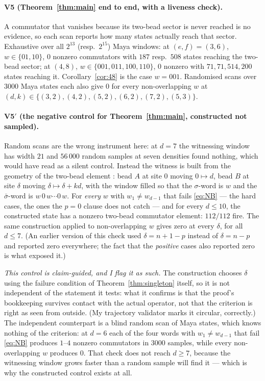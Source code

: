 \documentclass[11pt]{article}
\theoremstyle{definition}
\theoremstyle{remark}
\begin{document}
\paragraph{V5 (Theorem~\ref{thm:main} end to end, with a liveness check).}  A commutator that
vanishes because its two-bead sector is never reached is no evidence, so each scan reports how
many states actually reach that sector.  Exhaustive over all $2^{13}$ (resp.\ $2^{15}$) Maya
windows: at $(e,f)=(3,6)$, $w\in\{01,10\}$, $0$ nonzero commutators with $187$ resp.\ $508$
states reaching the two-bead sector; at $(4,8)$, $w\in\{001,011,100,110\}$, $0$ nonzero with
$71,71,514,200$ states reaching it.  Corollary~\ref{cor:48} is the case $w=001$.  Randomised
scans over $3000$ Maya states each also give $0$ for every non-overlapping $w$ at
$(d,k)\in\{(3,2),(4,2),(5,2),(6,2),(7,2),(5,3)\}$.

\paragraph{V5$'$ (the negative control for Theorem~\ref{thm:main}, constructed not sampled).}
Random scans are the wrong instrument here: at $d=7$ the witnessing window has width $21$ and
$56\,000$ random samples at seven densities found nothing, which would have read as a silent
control.  Instead the witness is built from the geometry of the two-bead element \cite[Lemma 4.3]{Q149}: bead $A$ at site $0$
moving $0\mapsto d$, bead $B$ at site $\delta$ moving $\delta\mapsto\delta+kd$, with the window
filled so that the $\sigma$-word is $w$ and the $\bar\sigma$-word is $w\,0\,w\cdots0\,w$.  For
\emph{every} $w$ with $w_1\ne w_{d-1}$ that fails \eqref{eq:NB} --- the hard cases, the ones the
$p=0$ clause does not catch --- and for every $d\le10$, the constructed state has a nonzero
two-bead commutator element: $112/112$ fire.  The same construction applied to
non-overlapping $w$ gives zero at every $\delta$, for all $d\le7$.  (An earlier version of this
check used $\delta=n+1-p$ instead of $\delta=n-p$ and reported zero everywhere; the fact that
the \emph{positive} cases also reported zero is what exposed it.)

\emph{This control is claim-guided, and I flag it as such.}  The construction chooses $\delta$
using the failure condition of Theorem~\ref{thm:singleton} itself, so it is not independent of
the statement it tests: what it confirms is that the proof's bookkeeping survives contact with
the actual operator, not that the criterion is right as seen from outside.  (My trajectory
validator marks it circular, correctly.)  The independent counterpart is a blind random scan of
Maya states, which knows nothing of the criterion: at $d=6$ each of the four words with
$w_1\ne w_{d-1}$ that fail \eqref{eq:NB} produces $1$--$4$ nonzero commutators in $3000$
samples, while every non-overlapping $w$ produces $0$.  That check does not reach $d\ge7$,
because the witnessing window grows faster than a random sample will find it --- which is why
the constructed control exists at all.
\end{document}
